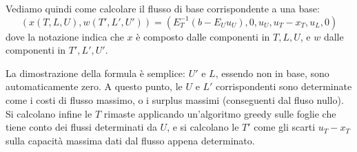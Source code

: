 \documentclass[a4paper,11pt]{article}
\begin{document}
Vediamo quindi come calcolare il flusso di base corrispondente a una base:
$$
(x(T, L, U), w(T', L', U')) = \left( E_T^{-1} (b - E_U u_U), 0, u_U, u_T - x_T, u_L, 0 \right)
$$
dove la notazione indica che $x$ è composto dalle componenti in $T, L, U$, e $w$ dalle componenti in $T', L', U'$.

La dimostrazione della formula è semplice: $U'$ e $L$, essendo non in base, sono automaticamente zero.
A questo punto, le $U$ e $L'$ corrispondenti sono determinate come i costi di flusso massimo, o i surplus massimi (conseguenti dal fluso nullo).
Si calcolano infine le $T$ rimaste applicando un'algoritmo greedy sulle foglie che tiene conto dei flussi determinati da $U$, e si calcolano le $T'$ come gli scarti $u_T - x_T$ sulla capacità massima dati dal flusso appena determinato.
\end{document}
